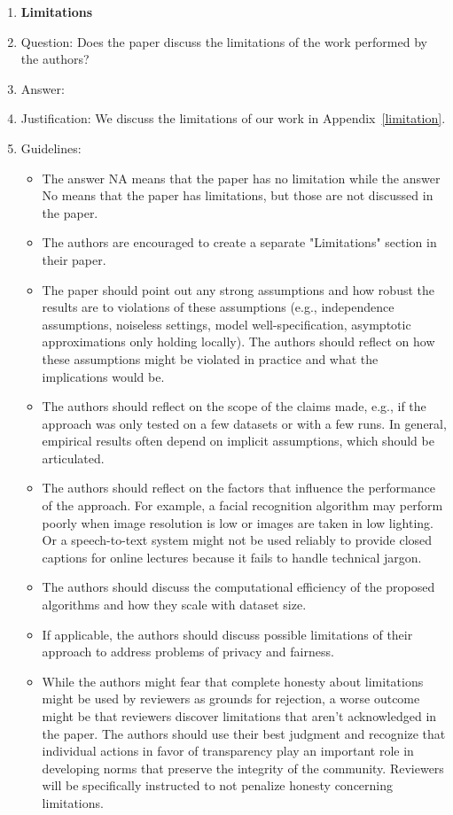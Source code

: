 \documentclass{article}
\begin{document}
\begin{enumerate}
\item {\bf Limitations}
    \item[] Question: Does the paper discuss the limitations of the work performed by the authors?
    \item[] Answer: \answerYes{} %
    \item[] Justification: We discuss the limitations of our work in Appendix~\ref{limitation}.
    \item[] Guidelines:
    \begin{itemize}
        \item The answer NA means that the paper has no limitation while the answer No means that the paper has limitations, but those are not discussed in the paper. 
        \item The authors are encouraged to create a separate "Limitations" section in their paper.
        \item The paper should point out any strong assumptions and how robust the results are to violations of these assumptions (e.g., independence assumptions, noiseless settings, model well-specification, asymptotic approximations only holding locally). The authors should reflect on how these assumptions might be violated in practice and what the implications would be.
        \item The authors should reflect on the scope of the claims made, e.g., if the approach was only tested on a few datasets or with a few runs. In general, empirical results often depend on implicit assumptions, which should be articulated.
        \item The authors should reflect on the factors that influence the performance of the approach. For example, a facial recognition algorithm may perform poorly when image resolution is low or images are taken in low lighting. Or a speech-to-text system might not be used reliably to provide closed captions for online lectures because it fails to handle technical jargon.
        \item The authors should discuss the computational efficiency of the proposed algorithms and how they scale with dataset size.
        \item If applicable, the authors should discuss possible limitations of their approach to address problems of privacy and fairness.
        \item While the authors might fear that complete honesty about limitations might be used by reviewers as grounds for rejection, a worse outcome might be that reviewers discover limitations that aren't acknowledged in the paper. The authors should use their best judgment and recognize that individual actions in favor of transparency play an important role in developing norms that preserve the integrity of the community. Reviewers will be specifically instructed to not penalize honesty concerning limitations.
    \end{itemize}


\end{enumerate}
\end{document}

